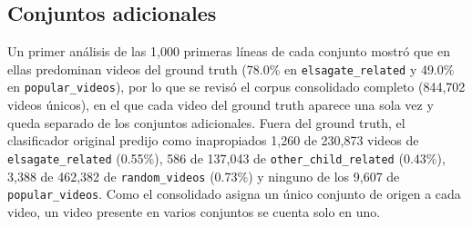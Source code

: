 \documentclass[conference]{IEEEtran}
\begin{document}
\subsection{Conjuntos adicionales}\label{sec:adic}
Un primer análisis de las 1,000 primeras líneas de cada conjunto mostró que en ellas predominan videos del ground truth (78.0\% en \texttt{elsagate\_related} y 49.0\% en \texttt{popular\_videos}), por lo que se revisó el corpus consolidado completo (844,702 videos únicos), en el que cada video del ground truth aparece una sola vez y queda separado de los conjuntos adicionales. Fuera del ground truth, el clasificador original predijo como inapropiados 1,260 de 230,873 videos de \texttt{elsagate\_related} (0.55\%), 586 de 137,043 de \texttt{other\_child\_related} (0.43\%), 3,388 de 462,382 de \texttt{random\_videos} (0.73\%) y ninguno de los 9,607 de \texttt{popular\_videos}. Como el consolidado asigna un único conjunto de origen a cada video, un video presente en varios conjuntos se cuenta solo en uno.

\end{document}
